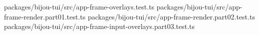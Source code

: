 \begin{itemize}
\allowbreak{}p\allowbreak{}a\allowbreak{}c\allowbreak{}k\allowbreak{}a\allowbreak{}g\allowbreak{}e\allowbreak{}s\allowbreak{}/\allowbreak{}b\allowbreak{}i\allowbreak{}j\allowbreak{}o\allowbreak{}u\allowbreak{}-\allowbreak{}t\allowbreak{}u\allowbreak{}i\allowbreak{}/\allowbreak{}s\allowbreak{}r\allowbreak{}c\allowbreak{}/\allowbreak{}a\allowbreak{}p\allowbreak{}p\allowbreak{}-\allowbreak{}f\allowbreak{}r\allowbreak{}a\allowbreak{}m\allowbreak{}e\allowbreak{}-\allowbreak{}o\allowbreak{}v\allowbreak{}e\allowbreak{}r\allowbreak{}l\allowbreak{}a\allowbreak{}y\allowbreak{}s\allowbreak{}.\allowbreak{}t\allowbreak{}e\allowbreak{}s\allowbreak{}t\allowbreak{}.\allowbreak{}t\allowbreak{}s\allowbreak{} \allowbreak{}p\allowbreak{}a\allowbreak{}c\allowbreak{}k\allowbreak{}a\allowbreak{}g\allowbreak{}e\allowbreak{}s\allowbreak{}/\allowbreak{}b\allowbreak{}i\allowbreak{}j\allowbreak{}o\allowbreak{}u\allowbreak{}-\allowbreak{}t\allowbreak{}u\allowbreak{}i\allowbreak{}/\allowbreak{}s\allowbreak{}r\allowbreak{}c\allowbreak{}/\allowbreak{}a\allowbreak{}p\allowbreak{}p\allowbreak{}-\allowbreak{}f\allowbreak{}r\allowbreak{}a\allowbreak{}m\allowbreak{}e\allowbreak{}-\allowbreak{}r\allowbreak{}e\allowbreak{}n\allowbreak{}d\allowbreak{}e\allowbreak{}r\allowbreak{}.\allowbreak{}p\allowbreak{}a\allowbreak{}r\allowbreak{}t\allowbreak{}0\allowbreak{}1\allowbreak{}.\allowbreak{}t\allowbreak{}e\allowbreak{}s\allowbreak{}t\allowbreak{}.\allowbreak{}t\allowbreak{}s\allowbreak{} \allowbreak{}p\allowbreak{}a\allowbreak{}c\allowbreak{}k\allowbreak{}a\allowbreak{}g\allowbreak{}e\allowbreak{}s\allowbreak{}/\allowbreak{}b\allowbreak{}i\allowbreak{}j\allowbreak{}o\allowbreak{}u\allowbreak{}-\allowbreak{}t\allowbreak{}u\allowbreak{}i\allowbreak{}/\allowbreak{}s\allowbreak{}r\allowbreak{}c\allowbreak{}/\allowbreak{}a\allowbreak{}p\allowbreak{}p\allowbreak{}-\allowbreak{}f\allowbreak{}r\allowbreak{}a\allowbreak{}m\allowbreak{}e\allowbreak{}-\allowbreak{}r\allowbreak{}e\allowbreak{}n\allowbreak{}d\allowbreak{}e\allowbreak{}r\allowbreak{}.\allowbreak{}p\allowbreak{}a\allowbreak{}r\allowbreak{}t\allowbreak{}0\allowbreak{}2\allowbreak{}.\allowbreak{}t\allowbreak{}e\allowbreak{}s\allowbreak{}t\allowbreak{}.\allowbreak{}t\allowbreak{}s\allowbreak{} \allowbreak{}p\allowbreak{}a\allowbreak{}c\allowbreak{}k\allowbreak{}a\allowbreak{}g\allowbreak{}e\allowbreak{}s\allowbreak{}/\allowbreak{}b\allowbreak{}i\allowbreak{}j\allowbreak{}o\allowbreak{}u\allowbreak{}-\allowbreak{}t\allowbreak{}u\allowbreak{}i\allowbreak{}/\allowbreak{}s\allowbreak{}r\allowbreak{}c\allowbreak{}/\allowbreak{}a\allowbreak{}p\allowbreak{}p\allowbreak{}-\allowbreak{}f\allowbreak{}r\allowbreak{}a\allowbreak{}m\allowbreak{}e\allowbreak{}-\allowbreak{}i\allowbreak{}n\allowbreak{}p\allowbreak{}u\allowbreak{}t\allowbreak{}-\allowbreak{}o\allowbreak{}v\allowbreak{}e\allowbreak{}r\allowbreak{}l\allowbreak{}a\allowbreak{}y\allowbreak{}s\allowbreak{}.\allowbreak{}p\allowbreak{}a\allowbreak{}r\allowbreak{}t\allowbreak{}0\allowbreak{}3\allowbreak{}.\allowbreak{}t\allowbreak{}e\allowbreak{}s\allowbreak{}t\allowbreak{}.\allowbreak{}t\allowbreak{}s\allowbreak{} 
\end{itemize}
